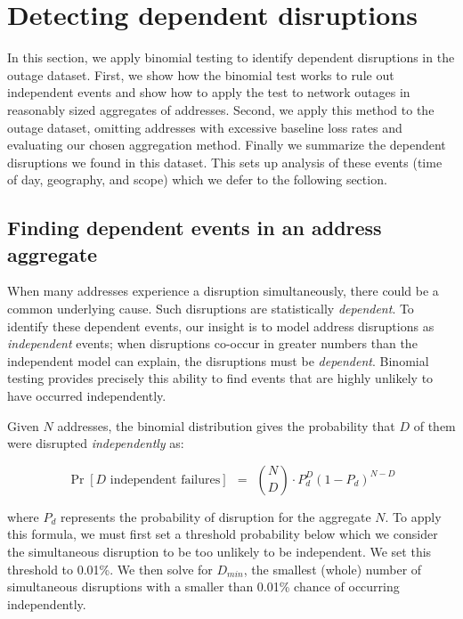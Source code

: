 \section{Detecting dependent disruptions}
\label{sec:method}

In this section, we apply binomial testing to
identify dependent disruptions in the outage dataset.
First, we show how the binomial test works to rule out
independent events and show how to apply the test to network
outages in reasonably sized aggregates of
addresses.  Second, we apply this method to the outage
dataset, omitting addresses with excessive baseline loss
rates and evaluating our chosen aggregation method.  Finally
we summarize the dependent disruptions we found in this
dataset.  This sets up analysis of these events (time of
day, geography, and scope) which we defer to the following
section.


\subsection{Finding dependent events in an address aggregate}
\label{sec:aggregates}

When many addresses experience a disruption simultaneously, there
could be a common underlying cause.
%
Such disruptions are statistically \emph{dependent}.
%
To identify these dependent events, our insight is to model address disruptions as
\emph{independent} events; when disruptions co-occur in
greater numbers than the independent model can explain, the
disruptions must be \emph{dependent}.
%
Binomial testing provides precisely this ability to find
events that are highly unlikely to have occurred
independently.

Given $N$ addresses, the binomial distribution gives the probability
that $D$ of them were disrupted \emph{independently} as:

\begin{equation}
	\Pr[D \mbox{~independent failures}] ~~=~~ {N\choose D} \cdot P_d^D(1-P_d)^{N-D}
	\label{eq:binomial}
\end{equation}

\noindent where $P_d$ represents the probability of disruption for the aggregate $N$.
To apply this formula, we must first set a threshold probability below which
we consider the simultaneous disruption to be too unlikely to be independent.
We set this threshold to 0.01\%.  We then solve for $D_{min}$, the smallest (whole) number of
simultaneous disruptions with a smaller than 0.01\% chance of
occurring independently.

